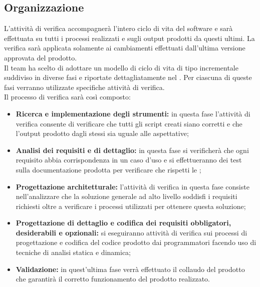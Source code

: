 	\subsection{Organizzazione}
	L'attività di verifica accompagnerà l'intero ciclo di vita del software e sarà effettuata su tutti i processi realizzati e sugli output prodotti da questi ultimi. La verifica sarà applicata solamente ai cambiamenti effettuati dall'ultima versione approvata del prodotto.\\
	Il team ha scelto di adottare un modello di ciclo di vita di tipo incrementale suddiviso in diverse fasi e riportate dettagliatamente nel \docNameVersionPdP. Per ciascuna di queste fasi verranno utilizzate specifiche attività di verifica.\\ Il processo di verifica sarà così composto:
	\begin{itemize}
		\item \textbf{Ricerca e implementazione degli strumenti:}  in questa fase l'attività di verifica consente di verificare che tutti gli script creati siano corretti e che l'output prodotto dagli stessi sia uguale alle aspettative;
		\item \textbf{Analisi dei requisiti e di dettaglio:} in questa fase si verificherà che ogni requisito abbia corrispondenza in un caso d'uso e si effettueranno dei test sulla documentazione prodotta per verificare che rispetti le \docNameVersionNdP;
		\item \textbf{Progettazione architetturale:} l'attività di verifica in questa fase consiste nell'analizzare che la soluzione generale ad alto livello soddisfi i requisiti richiesti oltre a verificare i processi utilizzati per ottenere questa soluzione;
		\item \textbf{Progettazione di dettaglio e codifica dei requisiti obbligatori, desiderabili e opzionali:} si eseguiranno attività di verifica sui processi di progettazione e codifica del codice prodotto dai programmatori facendo uso di tecniche di analisi statica e dinamica;
		\item \textbf{Validazione\gloss{}:} in quest'ultima fase verrà effettuato il collaudo del prodotto che garantirà il corretto funzionamento del prodotto realizzato.
	\end{itemize}
	

